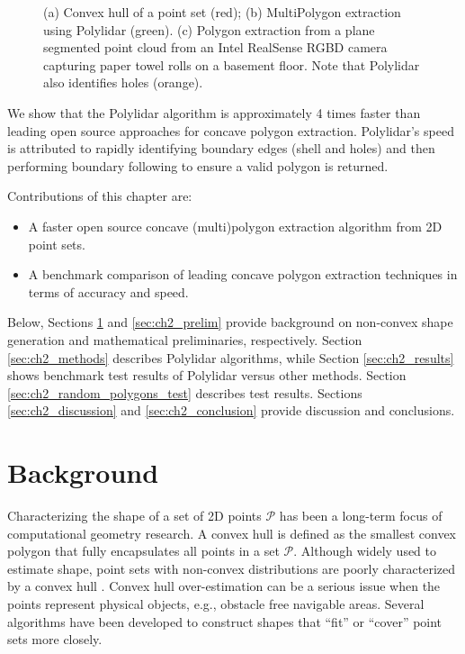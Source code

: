 \begin{figure}[t]
\begin{subfigure}{.25\linewidth}
    \caption{}
    \label{fig:ch2_realsense}
  \end{subfigure}
  \caption[Demonstration of Polylidar]{(a) Convex hull of a point set (red); (b) MultiPolygon extraction using Polylidar (green).
  (c) Polygon extraction from a plane segmented point cloud from an Intel RealSense RGBD camera capturing paper towel rolls on a basement floor. 
  Note that Polylidar also identifies holes (orange).}
  \label{fig:ch2_convex_concave} 
\end{figure}



We show that the Polylidar algorithm is approximately 4 times faster than leading open source approaches for concave polygon extraction. Polylidar's speed is attributed to rapidly identifying boundary edges (shell and holes) and then performing  boundary following to ensure a valid polygon is returned. 


Contributions of this chapter are:
\begin{itemize}
  \item A faster open source \cite{Castagno_Github_Polylidar} concave (multi)polygon extraction algorithm from 2D point sets.
  \item A benchmark comparison of leading concave polygon extraction techniques in terms of accuracy and speed.
\end{itemize}

Below, Sections \ref{sec:ch2_background} and \ref{sec:ch2_prelim} provide background on non-convex shape generation and mathematical preliminaries, respectively. Section \ref{sec:ch2_methods} describes Polylidar algorithms, while Section \ref{sec:ch2_results} shows benchmark test results of Polylidar versus other methods.  Section \ref{sec:ch2_random_polygons_test} describes test results. Sections  \ref{sec:ch2_discussion} and \ref{sec:ch2_conclusion} provide discussion and conclusions.



\section{Background}\label{sec:ch2_background}

Characterizing the shape of a set of 2D points $\mathcal{P}$ has been a long-term focus of computational geometry research. A convex hull is defined as the smallest convex polygon that fully encapsulates all points in a set $\mathcal{P}$.  Although widely used to estimate shape, point sets with non-convex distributions are poorly characterized by a convex hull \cite{duckham_efficient_2008}.  Convex hull over-estimation can be a serious issue when the points represent physical objects, e.g., obstacle free navigable areas. Several algorithms have been developed to construct shapes that ``fit'' or ``cover'' point sets more closely. 

